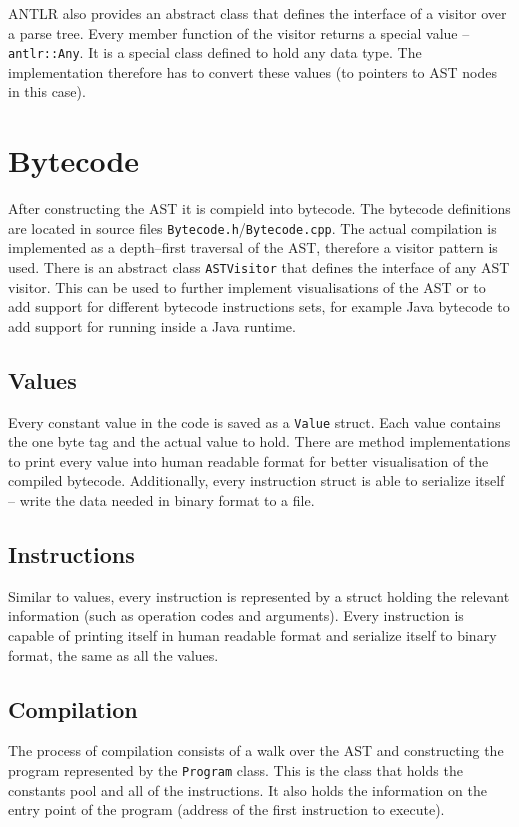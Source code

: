 \documentclass[thesis=M,english]{FITthesis}[2019/12/23]
\begin{document}
ANTLR also provides an abstract class that defines the interface of a visitor over a parse tree. Every member function of the visitor returns a special value --
\texttt{antlr::Any}. It is a special class defined to hold any data type. The implementation therefore has to convert these values (to pointers to AST nodes
in this case). 

\section{Bytecode}
After constructing the AST it is compield into bytecode. The bytecode definitions are located in source files \texttt{Bytecode.h}/\texttt{Bytecode.cpp}. The actual
compilation is implemented as a depth--first traversal of the AST, therefore a visitor pattern is used. There is an abstract class \texttt{ASTVisitor} that defines
the interface of any AST visitor. This can be used to further implement visualisations of the AST or to add support for different bytecode instructions sets,
for example Java bytecode to add support for running inside a Java runtime.

\subsection{Values}
Every constant value in the code is saved as a \texttt{Value} struct. Each value contains the one byte tag and the actual value to hold. There are method implementations
to print every value into human readable format for better visualisation of the compiled bytecode. Additionally, every instruction struct is able to serialize itself -- 
write the data needed in binary format to a file.

\subsection{Instructions}
Similar to values, every instruction is represented by a struct holding the relevant information (such as operation codes and arguments). Every instruction is capable
of printing itself in human readable format and serialize itself to binary format, the same as all the values.

\subsection{Compilation}
The process of compilation consists of a walk over the AST and constructing the program represented by the \texttt{Program} class. This is the class that holds
the constants pool and all of the instructions. It also holds the information on the entry point of the program (address of the first instruction to execute).
\end{document}
